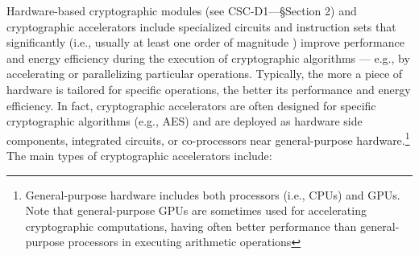 Hardware-based cryptographic modules (see CSC-D1---§Section 2) and cryptographic accelerators include specialized circuits and instruction sets that significantly (i.e., usually at least one order of magnitude \cite{baldanzi_crypto_2019}) improve performance \cite{meurice_de_dormale_high_2007} and energy efficiency \cite{haas_evaluating_2013} during the execution of cryptographic algorithms --- e.g., by accelerating or parallelizing particular operations. Typically, the more a piece of hardware is tailored for specific operations, the better its performance and energy efficiency. In fact, cryptographic accelerators are often designed for specific cryptographic algorithms (e.g., AES) and are deployed as hardware side components, integrated circuits, or co-processors near general-purpose hardware.\footnote{General-purpose hardware includes both processors (i.e., CPUs) and GPUs. Note that general-purpose GPUs are sometimes used for accelerating cryptographic computations, having often better performance than general-purpose processors in executing arithmetic operations} The main types of cryptographic accelerators include:
